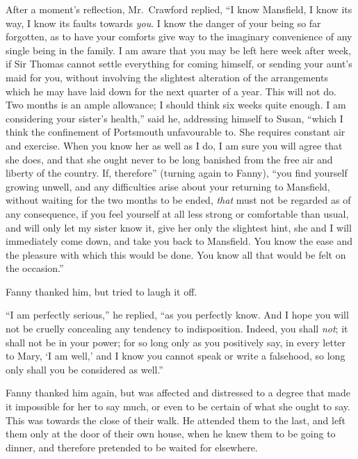 After a moment's reflection, Mr.\ Crawford replied,
``I know Mansfield, I know its way, I know its faults
towards \emph{you}.  I know the danger of your being so
far forgotten, as to have your comforts give way to the
imaginary convenience of any single being in the family.
I am aware that you may be left here week after week,
if Sir Thomas cannot settle everything for coming himself,
or sending your aunt's maid for you, without involving
the slightest alteration of the arrangements which he
may have laid down for the next quarter of a year.
This will not do.  Two months is an ample allowance;
I should think six weeks quite enough.  I am considering
your sister's health,'' said he, addressing himself to Susan,
``which I think the confinement of Portsmouth unfavourable to.
She requires constant air and exercise.  When you know her
as well as I do, I am sure you will agree that she does,
and that she ought never to be long banished from the free air
and liberty of the country.  If, therefore'' (turning again
to Fanny), ``you find yourself growing unwell, and any
difficulties arise about your returning to Mansfield,
without waiting for the two months to be ended,
\emph{that} must not be regarded as of any consequence,
if you feel yourself at all less strong or comfortable
than usual, and will only let my sister know it, give her
only the slightest hint, she and I will immediately
come down, and take you back to Mansfield.  You know
the ease and the pleasure with which this would be done.
You know all that would be felt on the occasion.''

Fanny thanked him, but tried to laugh it off.

``I am perfectly serious,'' he replied, ``as you perfectly know.
And I hope you will not be cruelly concealing any
tendency to indisposition.  Indeed, you shall \emph{not};
it shall not be in your power; for so long only as you
positively say, in every letter to Mary, `I am well,'
and I know you cannot speak or write a falsehood, so long
only shall you be considered as well.''

Fanny thanked him again, but was affected and distressed
to a degree that made it impossible for her to say much,
or even to be certain of what she ought to say.
This was towards the close of their walk.  He attended
them to the last, and left them only at the door of their
own house, when he knew them to be going to dinner,
and therefore pretended to be waited for elsewhere.

